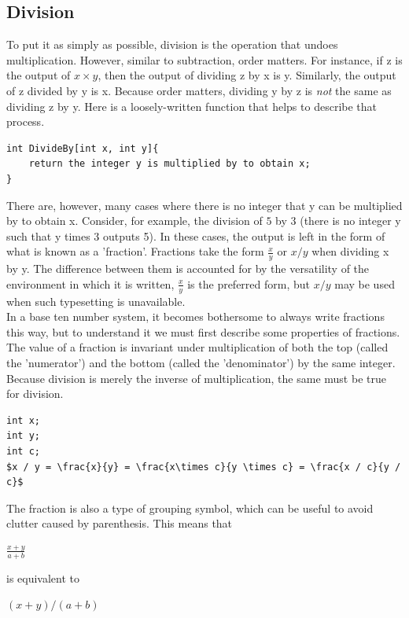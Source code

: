 \subsection{Division}
To put it as simply as possible, division is the operation that undoes multiplication. However, similar to subtraction, order matters. For instance, if z is the output of $x\times y$, then the output of dividing z by x is y. Similarly, the output of z divided by y is x. Because order matters, dividing y by z is \emph{not} the same as dividing z by y. Here is a loosely-written function that helps to describe that process.
\begin{center}
\begin{verbatim}
int DivideBy[int x, int y]{
	return the integer y is multiplied by to obtain x;
}
\end{verbatim}
\end{center}
There are, however, many cases where there is no integer that y can be multiplied by to obtain x. Consider, for example, the division of $5$ by $3$ (there is no integer y such that y times 3 outputs 5). In these cases, the output is left in the form of what is known as a 'fraction'. Fractions take the form $\frac{x}{y}$ or $x/y$ when dividing x by y. The difference between them is accounted for by the versatility of the environment in which it is written, $\frac{x}{y}$ is the preferred form, but $x/y$ may be used when such typesetting is unavailable. \\
In a base ten number system, it becomes bothersome to always write fractions this way, but to understand it we must first describe some properties of fractions. \\
The value of a fraction is invariant under multiplication of both the top (called the 'numerator') and the bottom (called the 'denominator') by the same integer. Because division is merely the inverse of multiplication, the same must be true for division.
\begin{center}
\begin{verbatim}
int x;
int y;
int c;
$x / y = \frac{x}{y} = \frac{x\times c}{y \times c} = \frac{x / c}{y / c}$
\end{verbatim}
\end{center}
The fraction is also a type of grouping symbol, which can be useful to avoid clutter caused by parenthesis. This means that
\begin{center}
$\frac{x+y}{a+b}$
\end{center}
is equivalent to
\begin{center}
$(x+y)/(a+b)$
\end{center}

